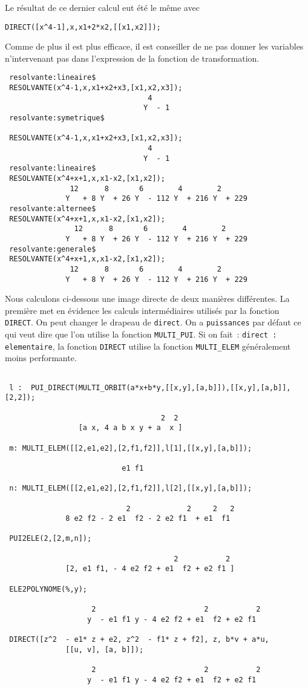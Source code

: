 \documentclass[11pt]{article}
\begin{document}
\normalsize
Le r\'esultat de ce dernier calcul eut \'et\'e le m\^eme avec
\begin{verbatim} 
DIRECT([x^4-1],x,x1+2*x2,[[x1,x2]]);
\end{verbatim}
Comme de plus il est
plus efficace, il est conseiller de ne pas donner les variables 
n'intervenant pas dans l'expression de la fonction de transformation.
\small
\begin{verbatim} 
 resolvante:lineaire$
 RESOLVANTE(x^4-1,x,x1+x2+x3,[x1,x2,x3]);
                                 4
                                Y  - 1
 resolvante:symetrique$

 RESOLVANTE(x^4-1,x,x1+x2+x3,[x1,x2,x3]);
                                 4
                                Y  - 1
 resolvante:lineaire$
 RESOLVANTE(x^4+x+1,x,x1-x2,[x1,x2]);
               12      8       6        4        2
              Y   + 8 Y  + 26 Y  - 112 Y  + 216 Y  + 229
 resolvante:alternee$
 RESOLVANTE(x^4+x+1,x,x1-x2,[x1,x2]);
                12      8       6        4        2
              Y   + 8 Y  + 26 Y  - 112 Y  + 216 Y  + 229
 resolvante:generale$
 RESOLVANTE(x^4+x+1,x,x1-x2,[x1,x2]);
               12      8       6        4        2
              Y   + 8 Y  + 26 Y  - 112 Y  + 216 Y  + 229 
\end{verbatim}
\normalsize
Nous calculons ci-dessous une image directe de deux mani\`eres diff\'erentes.
La premi\`ere met en \'evidence les calculs interm\'ediaires
utilis\'es par la fonction {\tt DIRECT}.
On peut changer le drapeau de {\tt direct}. On a {\tt puissances} par
d\'efaut ce qui veut dire que l'on utilise la fonction {\tt MULTI\_PUI}. Si
on fait~: {\tt direct : elementaire}, la fonction {\tt DIRECT} utilise 
la fonction {\tt MULTI\_ELEM}
g\'en\'eralement moins performante.
\small
\begin{verbatim}

 l :  PUI_DIRECT(MULTI_ORBIT(a*x+b*y,[[x,y],[a,b]]),[[x,y],[a,b]],[2,2]);

                                    2  2
                 [a x, 4 a b x y + a  x ]

 m: MULTI_ELEM([[2,e1,e2],[2,f1,f2]],l[1],[[x,y],[a,b]]);

                           e1 f1

 n: MULTI_ELEM([[2,e1,e2],[2,f1,f2]],l[2],[[x,y],[a,b]]);

                            2             2     2   2
              8 e2 f2 - 2 e1  f2 - 2 e2 f1  + e1  f1

 PUI2ELE(2,[2,m,n]);

                                       2           2
              [2, e1 f1, - 4 e2 f2 + e1  f2 + e2 f1 ]
 
 ELE2POLYNOME(%,y);

                    2                         2           2
                   y  - e1 f1 y - 4 e2 f2 + e1  f2 + e2 f1

 DIRECT([z^2  - e1* z + e2, z^2  - f1* z + f2], z, b*v + a*u, 
              [[u, v], [a, b]]);

                    2                         2           2
                   y  - e1 f1 y - 4 e2 f2 + e1  f2 + e2 f1

\end{verbatim}
\end{document}
